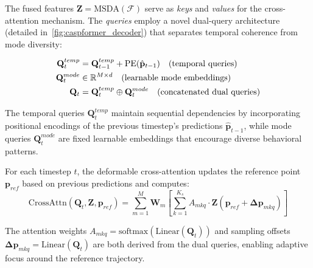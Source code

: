 \begin{description}[leftmargin=1em,itemsep=2pt]
\begin{description}[leftmargin=1em,itemsep=2pt]
\item[Recurrent Deformable Cross-Attention.] The fused features \(\mathbf{Z} = \text{MSDA}(\boldsymbol{\mathcal{F}})\) serve as \emph{keys} and \emph{values} for the cross-attention mechanism. The \emph{queries} employ a novel dual-query architecture (detailed in~\autoref{fig:caspformer_decoder}) that separates temporal coherence from mode diversity:

\begin{equation}
\label{eq:dual_query_construction}
\begin{aligned}
\mathbf{Q}_t^{temp} &= \mathbf{Q}_{t-1}^{temp} + \text{PE}(\hat{\mathbf{p}}_{t-1}) \quad \text{(temporal queries)} \\
\mathbf{Q}_t^{mode} &\in \mathbb{R}^{M \times d} \quad \text{(learnable mode embeddings)} \\
\mathbf{Q}_t &= \mathbf{Q}_t^{temp} \oplus \mathbf{Q}_t^{mode} \quad \text{(concatenated dual queries)}
\end{aligned}
\end{equation}

The temporal queries \(\mathbf{Q}_t^{temp}\) maintain sequential dependencies by incorporating positional encodings of the previous timestep's predictions \(\hat{\mathbf{p}}_{t-1}\), while mode queries \(\mathbf{Q}_t^{mode}\) are fixed learnable embeddings that encourage diverse behavioral patterns.

For each timestep \(t\), the deformable cross-attention updates the reference point \(\mathbf{p}_{ref}\) based on previous predictions and computes:
\begin{equation}
\label{eq:cross_attention_operation}
\text{CrossAttn}(\mathbf{Q}_t, \mathbf{Z}, \mathbf{p}_{ref}) = \sum_{m=1}^{M} \mathbf{W}_m \left[ \sum_{k=1}^{K_s} A_{mkq} \cdot \mathbf{Z}(\mathbf{p}_{ref} + \boldsymbol{\Delta p}_{mkq}) \right]
\end{equation}

The attention weights \(A_{mkq} = \text{softmax}(\text{Linear}(\mathbf{Q}_t))\) and sampling offsets \(\boldsymbol{\Delta p}_{mkq} = \text{Linear}(\mathbf{Q}_t)\) are both derived from the dual queries, enabling adaptive focus around the reference trajectory.


\end{description}
\end{description}
